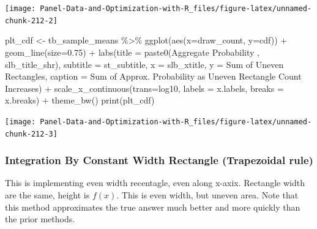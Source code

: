 \documentclass[
]{book}
\newenvironment{Shaded}{\begin{snugshade}}{\end{snugshade}}
\newcommand{\AttributeTok}[1]{\textcolor[rgb]{0.77,0.63,0.00}{#1}}
\newcommand{\FloatTok}[1]{\textcolor[rgb]{0.00,0.00,0.81}{#1}}
\newcommand{\FunctionTok}[1]{\textcolor[rgb]{0.00,0.00,0.00}{#1}}
\newcommand{\NormalTok}[1]{#1}
\newcommand{\OtherTok}[1]{\textcolor[rgb]{0.56,0.35,0.01}{#1}}
\newcommand{\SpecialCharTok}[1]{\textcolor[rgb]{0.00,0.00,0.00}{#1}}
\newcommand{\StringTok}[1]{\textcolor[rgb]{0.31,0.60,0.02}{#1}}
\begin{document}
\begin{center}\texttt{[image: Panel-Data-and-Optimization-with-R\_files/figure-latex/unnamed-chunk-212-2]} \end{center}

\begin{Shaded}
\begin{Highlighting}[]
\NormalTok{plt\_cdf }\OtherTok{\textless{}{-}}\NormalTok{ tb\_sample\_means }\SpecialCharTok{\%\textgreater{}\%}
  \FunctionTok{ggplot}\NormalTok{(}\FunctionTok{aes}\NormalTok{(}\AttributeTok{x=}\NormalTok{draw\_count, }\AttributeTok{y=}\NormalTok{cdf)) }\SpecialCharTok{+}
  \FunctionTok{geom\_line}\NormalTok{(}\AttributeTok{size=}\FloatTok{0.75}\NormalTok{) }\SpecialCharTok{+}
  \FunctionTok{labs}\NormalTok{(}\AttributeTok{title =} \FunctionTok{paste0}\NormalTok{(}\StringTok{\textquotesingle{}Aggregate Probability \textquotesingle{}}\NormalTok{, slb\_title\_shr),}
       \AttributeTok{subtitle =}\NormalTok{ st\_subtitle,}
       \AttributeTok{x =}\NormalTok{ slb\_xtitle,}
       \AttributeTok{y =} \StringTok{\textquotesingle{}Sum of Uneven Rectangles\textquotesingle{}}\NormalTok{,}
       \AttributeTok{caption =} \StringTok{\textquotesingle{}Sum of Approx. Probability as Uneven Rectangle Count Increases\textquotesingle{}}\NormalTok{) }\SpecialCharTok{+}
  \FunctionTok{scale\_x\_continuous}\NormalTok{(}\AttributeTok{trans=}\StringTok{\textquotesingle{}log10\textquotesingle{}}\NormalTok{, }\AttributeTok{labels =}\NormalTok{ x.labels, }\AttributeTok{breaks =}\NormalTok{ x.breaks) }\SpecialCharTok{+}
  \FunctionTok{theme\_bw}\NormalTok{()}
\FunctionTok{print}\NormalTok{(plt\_cdf)}
\end{Highlighting}
\end{Shaded}

\begin{center}\texttt{[image: Panel-Data-and-Optimization-with-R\_files/figure-latex/unnamed-chunk-212-3]} \end{center}

\hypertarget{integration-by-constant-width-rectangle-trapezoidal-rule}{%
\subsubsection{Integration By Constant Width Rectangle (Trapezoidal rule)}\label{integration-by-constant-width-rectangle-trapezoidal-rule}}

This is implementing even width recentagle, even along x-axix. Rectangle width are the same, height is \(f(x)\). This is even width, but uneven area. Note that this method approximates the true answer much better and more quickly than the prior methods.
\end{document}
